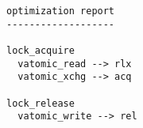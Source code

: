 \begin{lstlisting}[style=compact]
optimization report
-------------------

lock_acquire
  vatomic_read --> rlx
  vatomic_xchg --> acq

lock_release
  vatomic_write --> rel
\end{lstlisting}


